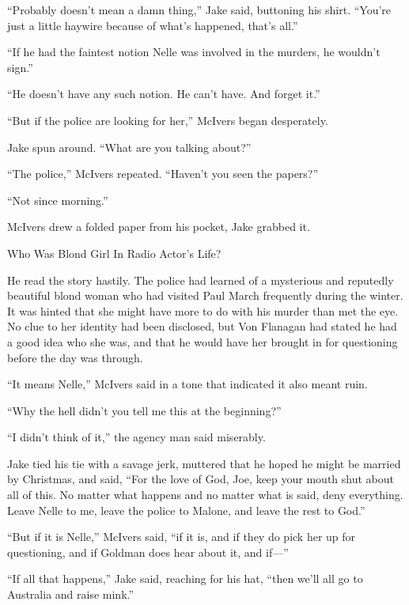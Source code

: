 \documentclass{novel}
\begin{document}
“Probably doesn’t mean a damn thing,” Jake said, buttoning his shirt. “You’re just a little haywire because of what’s happened, that’s all.”

“If he had the faintest notion Nelle was involved in the murders, he wouldn’t sign.”

“He doesn’t have any such notion. He can’t have. And forget it.”

“But if the police are looking for her,” McIvers began desperately.

Jake spun around. “What are you talking about?”

“The police,” McIvers repeated. “Haven’t you seen the papers?”

“Not since morning.”

McIvers drew a folded paper from his pocket, Jake grabbed it.

Who Was Blond Girl In Radio Actor’s Life?

He read the story hastily. The police had learned of a mysterious and reputedly beautiful blond woman who had visited Paul March frequently during the winter. It was hinted that she might have more to do with his murder than met the eye. No clue to her identity had been disclosed, but Von Flanagan had stated he had a good idea who she was, and that he would have her brought in for questioning before the day was through.

“It means Nelle,” McIvers said in a tone that indicated it also meant ruin.

“Why the hell didn’t you tell me this at the beginning?”

“I didn’t think of it,” the agency man said miserably.

Jake tied his tie with a savage jerk, muttered that he hoped he might be married by Christmas, and said, “For the love of God, Joe, keep your mouth shut about all of this. No matter what happens and no matter what is said, deny everything. Leave Nelle to me, leave the police to Malone, and leave the rest to God.”

“But if it is Nelle,” McIvers said, “if it is, and if they do pick her up for questioning, and if Goldman does hear about it, and if—”

“If all that happens,” Jake said, reaching for his hat, “then we’ll all go to Australia and raise mink.”

\vspace{2\nbs}
\clearpage
\thispagestyle{empty}

\begin{ChapterStart}
\vspace{3\nbs}
\end{ChapterStart}
\end{document}
